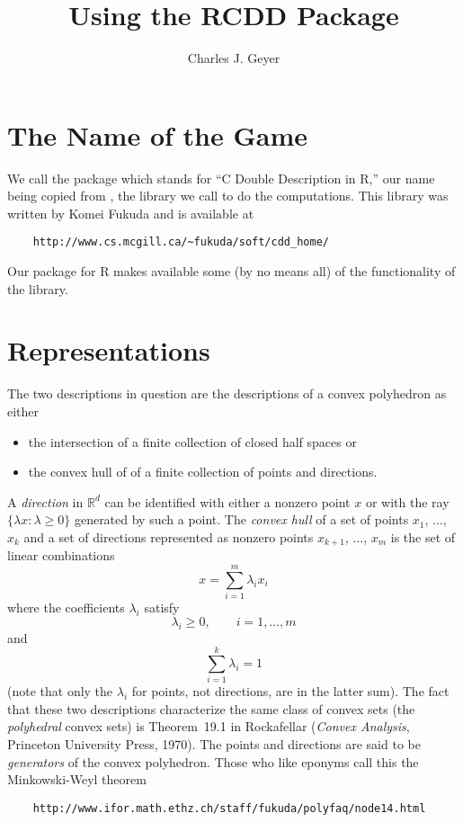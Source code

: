 \documentclass{article}
\newcommand{\real}{\mathbb{R}}
\begin{document}
\title{Using the RCDD Package}
\author{Charles J. Geyer}
\maketitle


\section{The Name of the Game}

We call the package \verb@rcdd@ which stands
for ``C Double Description in R,'' our name being copied from
\verb@cddlib@, the library we call to do the computations.
This library was written by Komei Fukuda and is available at
\begin{verbatim}
    http://www.cs.mcgill.ca/~fukuda/soft/cdd_home/
\end{verbatim}
Our \verb@rcdd@ package for R makes available some
(by no means all) of the functionality
of the \verb@cddlib@ library.

\section{Representations}

The two descriptions in question are the descriptions of a convex polyhedron
as either
\begin{itemize}
\item the intersection of a finite collection of closed half spaces or
\item the convex hull of of a finite collection of points and directions.
\end{itemize}

A \emph{direction} in $\real^d$ can be identified with
either a nonzero point $x$ or with
the ray $\{ \lambda x : \lambda \ge 0 \}$ generated by such a point.  
The \emph{convex hull} of a set of points $x_1$, $\ldots$, $x_k$ and
a set of directions represented as nonzero
points $x_{k + 1}$, $\ldots$, $x_m$ is the set of linear
combinations
$$
   x = \sum_{i = 1}^m \lambda_i x_i
$$
where the coefficients $\lambda_i$ satisfy
$$
   \lambda_i \ge 0, \qquad i = 1, \ldots, m
$$
and
$$
   \sum_{i = 1}^k \lambda_i = 1
$$
(note that only the $\lambda_i$ for points, not directions,
are in the latter sum).
The fact that these two descriptions characterize the same class of
convex sets (the \emph{polyhedral} convex sets) is Theorem~19.1
in Rockafellar (\emph{Convex Analysis}, Princeton University Press, 1970).
The points and directions are said to be \emph{generators} of the
convex polyhedron.  Those who like eponyms call this the
Minkowski-Weyl theorem
\begin{verbatim}
    http://www.ifor.math.ethz.ch/staff/fukuda/polyfaq/node14.html
\end{verbatim}
\end{document}
